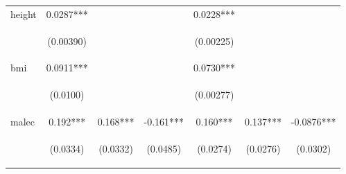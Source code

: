 \documentclass{article}[11pt,subeqn]
\begin{document}
\begin{spacing}{1.25}
\begin{sidewaystable}[!htbp]
\begin{center}
\begin{tabular}{lcccccc}
height	&	0.0287***	&		&		&	0.0228***	&		&		\\
\vspace{4pt}	&	 \begin{footnotesize}(0.00390) \end{footnotesize}	&	\begin{footnotesize}\end{footnotesize}	&	\begin{footnotesize}\end{footnotesize}	&	 \begin{footnotesize}(0.00225) \end{footnotesize}	&	\begin{footnotesize}\end{footnotesize}	&	\begin{footnotesize}\end{footnotesize}	\\
bmi	&	0.0911***	&		&		&	0.0730***	&		&		\\
\vspace{4pt}	&	 \begin{footnotesize}(0.0100) \end{footnotesize}	&	\begin{footnotesize}\end{footnotesize}	&	\begin{footnotesize}\end{footnotesize}	&	 \begin{footnotesize}(0.00277) \end{footnotesize}	&	\begin{footnotesize}\end{footnotesize}	&	\begin{footnotesize}\end{footnotesize}	\\
malec	&	0.192***	&	0.168***	&	-0.161***	&	0.160***	&	0.137***	&	-0.0876***	\\
\vspace{4pt}	&	 \begin{footnotesize}(0.0334) \end{footnotesize}	&	 \begin{footnotesize}(0.0332) \end{footnotesize}	&	 \begin{footnotesize}(0.0485) \end{footnotesize}	&	 \begin{footnotesize}(0.0274) \end{footnotesize}	&	 \begin{footnotesize}(0.0276) \end{footnotesize}	&	 \begin{footnotesize}(0.0302) \end{footnotesize}	\\

\end{tabular}
\end{center}
\end{sidewaystable}
\end{spacing}
\end{document}
